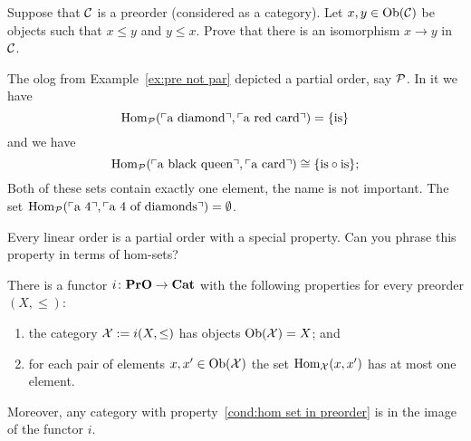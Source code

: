 \documentclass[CT4S-EN-RU]{subfiles}
\begin{document}
\begin{exerciseRUS}
\end{exerciseRUS}

\begin{exerciseENG}
Suppose that $\mathcal{C}$ is a preorder (considered as a category). Let $x,y\in\textnormal{Ob}(\mathcal{C})$ be objects such that $x\leq y$ and $y\leq x$. Prove that there is an isomorphism $x\to y$ in $\mathcal{C}$.
\end{exerciseENG}

\begin{exerciseRUS}
\end{exerciseRUS}

\begin{exampleENG}
The olog from Example~\ref{ex:pre not par} depicted a partial order, say $\mathcal{P}$. In it we have $$\textnormal{Hom}_\mathcal{P}(\textnormal{$\ulcorner$a diamond$\urcorner$},\textnormal{$\ulcorner$a red card$\urcorner$})=\{\textnormal{is}\}$$ and we have $$\textnormal{Hom}_\mathcal{P}(\textnormal{$\ulcorner$a black queen$\urcorner$},\textnormal{$\ulcorner$a card$\urcorner$})\cong\{\textnormal{is}\circ\textnormal{is}\};$$ Both of these sets contain exactly one element, the name is not important. The set $\textnormal{Hom}_\mathcal{P}(\textnormal{$\ulcorner$a 4$\urcorner$},\textnormal{$\ulcorner$a 4 of diamonds$\urcorner$})=\emptyset$. 
\end{exampleENG}

\begin{exampleRUS}
\end{exampleRUS}

\begin{exerciseENG}
Every linear order is a partial order with a special property. Can you phrase this property in terms of hom-sets?
\end{exerciseENG}

\begin{exerciseRUS}
\end{exerciseRUS}

\begin{propositionENG}\label{prop:preorders to cats}
There is a functor $i\colon{\mathbf{PrO}}\rightarrow{\mathbf{Cat}}$ with the following properties for every preorder $(X,\leq)$:
\begin{enumerate}
\item the category $\mathcal{X}:=i(X,\leq)$ has objects $\textnormal{Ob}(\mathcal{X})=X$; and
\item \label{cond:hom set in preorder} for each pair of elements $x,x'\in\textnormal{Ob}(\mathcal{X})$ the set $\textnormal{Hom}_\mathcal{X}(x,x')$ has at most one element.
\end{enumerate}
Moreover, any category with property~\ref{cond:hom set in preorder} is in the image of the functor $i$.
\end{propositionENG}
\end{document}
